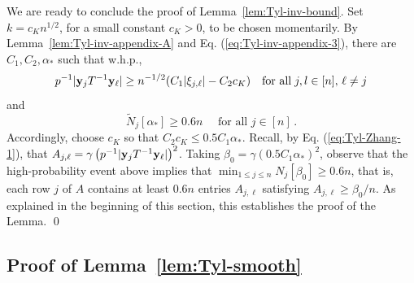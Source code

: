 \documentclass[times,sort&compress,3p]{elsarticle}
\begin{document}
We are ready to conclude the proof of Lemma~\ref{lem:Tyl-inv-bound}. Set $k=c_K n^{1/2}$, for a small constant $c_K>0$, to be chosen momentarily. By Lemma~\ref{lem:Tyl-inv-appendix-A} and Eq. (\ref{eq:Tyl-inv-appendix-3}), there are $C_1,C_2,\alpha_*$ such that w.h.p.,
\[
p^{-1}|{\bf y}_j T^{-1}{\bf y}_\ell| \ge n^{-1/2}(C_1|\xi_{j,\ell}|-C_2c_K)    \quad \textrm{for all}\; j,l\in [n],\,\ell \ne j 
\]
and 
\[
    \tilde{N}_j[\alpha_*]\ge 0.6n \quad \textrm{ for all } j\in[n]    \,.
\]
Accordingly, choose $c_K$ so that $C_2c_K\le 0.5C_1\alpha_*$.
Recall, by Eq. (\ref{eq:Tyl-Zhang-1}), that $A_{j,\ell}=\gamma \left(p^{-1}|{\bf y}_j T^{-1}{\bf y}_\ell|\right)^2$. Taking $\beta_0=\gamma(0.5C_1\alpha_*)^2$, 
observe that the high-probability event above implies that $\min_{1\le j \le n}N_j[\beta_0]\ge 0.6n$, that is,
each row $j$ of $A$ contains at least $0.6n$ entries $A_{j,\ell}$ satisfying $A_{j,\ell}\ge \beta_0/n$. As explained in the beginning of this section, this establishes the proof of the Lemma.
\qed


\subsection{Proof of Lemma~\ref{lem:Tyl-smooth}}
\label{sec:proof:lem:Tyl-smooth}
\end{document}
